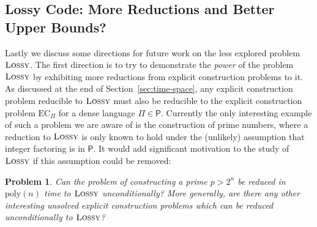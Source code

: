 \documentclass[11pt]{article}
\newtheorem{problem}{Problem}
\newcommand{\poly}{\mathrm{poly}}
\newcommand{\ec}{\mathrm{EC}_\Pi}
\newcommand{\lossy}{\textsc{Lossy}}
\begin{document}
\subsection{Lossy Code: More Reductions and Better Upper Bounds?}
Lastly we discuss some directions for future work on the less explored problem $\lossy$. The first direction is to try to demonstrate the \emph{power} of the problem $\lossy$ by exhibiting more reductions from explicit construction problems to it. As discussed at the end of Section~\ref{sec:time-space}, any explicit construction problem reducible to $\lossy$ must also be reducible to the explicit construction problem $\ec$ for a dense language $\Pi \in \mathsf{P}$. Currently the only interesting example of such a problem we are aware of is the construction of prime numbers, where a reduction to $\lossy$ is only known to hold under the (unlikely) assumption that integer factoring is in $\mathsf{P}$. It would add significant motivation to the study of $\lossy$ if this assumption could be removed:
\begin{problem}
Can the problem of constructing a prime $p> 2^n$ be reduced in $\poly(n)$ time to $\lossy$ unconditionally? More generally, are there any other interesting unsolved explicit construction problems which can be reduced unconditionally to $\lossy$?
\end{problem}
\end{document}
